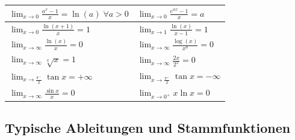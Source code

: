 \begin{center}
\begin{tabular}{ | l | l | }
                 \hline
                $\lim_{x \to 0} \frac{a^x - 1}{x} = \ln(a) \; \forall a > 0$ & $\lim_{x \to 0} \frac{e^{ax} - 1}{x} = a$ \\
                 \hline
                $\lim_{x \to 0} \frac{\ln(x + 1)}{x} = 1$ & $\lim_{x \to 1} \frac{\ln(x)}{x - 1} = 1$ \\
                 \hline
                $\lim_{x \to \infty} \frac{\ln(x)}{x} = 0$ & $\lim_{x \to \infty} \frac{\log(x)}{x^a} = 0$ \\
                 \hline
                $\lim_{x \to \infty} \sqrt[x]{x} = 1$ & $\lim_{x \to \infty} \frac{2x}{2^x} = 0$ \\
                 \hline 
                $\lim_{x \to \frac{\pi^-}{2}} \tan{x} = +\infty$ & $\lim_{x \to \frac{\pi^+}{2}} \tan{x} = -\infty$ \\
                \hline
                $\lim_{x \to \infty} \frac{\sin{x}}{x} = 0$ &  $\lim_{x \to 0^+} x\ln{x} = 0$\\
                \hline  
	\end{tabular}
\end{center}
\egroup

\subsection{Typische Ableitungen und Stammfunktionen}

\renewcommand\arraystretch{1.9}

